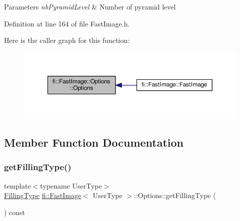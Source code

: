\begin{DoxyParams}{Parameters}
{\em nb\+Pyramid\+Level} & Number of pyramid level \\
\hline
\end{DoxyParams}


Definition at line 164 of file Fast\+Image.\+h.

Here is the caller graph for this function\+:
\nopagebreak
\begin{figure}[H]
\begin{center}
\leavevmode
\includegraphics[width=350pt]{dc/db9/classfi_1_1FastImage_1_1Options_a4a46b54745677fc1b88cffc2f8e53e2c_icgraph}
\end{center}
\end{figure}


\subsection{Member Function Documentation}
\mbox{\label{classfi_1_1FastImage_1_1Options_a876e33a2cd11a1991b0be6a5938e5cc0}} 
\subsubsection{\texorpdfstring{get\+Filling\+Type()}{getFillingType()}}
{\footnotesize\ttfamily template$<$typename User\+Type$>$ \\
\hyperlink{namespacefi_a6808b618c85d179a330ca388162215bd}{Filling\+Type} \hyperlink{classfi_1_1FastImage}{fi\+::\+Fast\+Image}$<$ User\+Type $>$\+::Options\+::get\+Filling\+Type (\begin{DoxyParamCaption}{ }\end{DoxyParamCaption}) const\hspace{0.3cm}{\ttfamily [inline]}}



